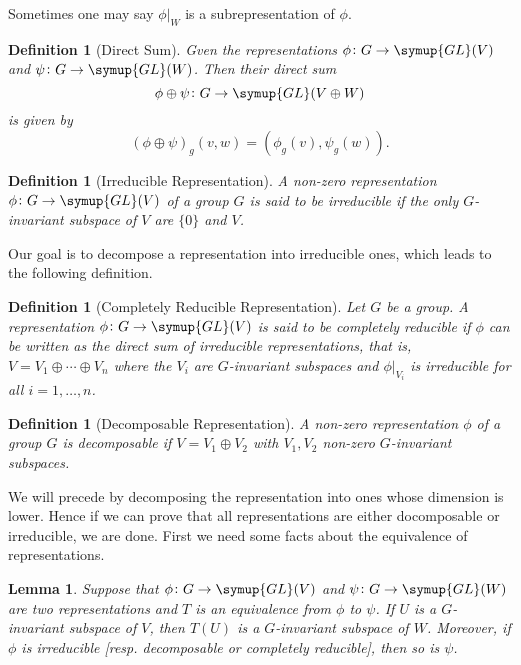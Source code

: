 \documentclass{assignment}[2019/10/15]
\theoremstyle{plain}
\newtheorem{definition}[theorem]{Definition}
\newtheorem{lemma}[theorem]{Lemma}
\newcommand{\GL}{\mathop{}\!\symup{GL}}
\numberwithin{equation}{section}
\begin{document}
    Sometimes one may say $\phi|_W$ is a subrepresentation of $\phi$.

    \begin{definition}[Direct Sum]
        Gven the representations $\phi\colon G\to \GL(V)$ and $\psi\colon G\to\GL(W)$. Then their \emph{direct sum}
        \begin{equation}
            \phi\oplus\psi\colon G\to\GL(V\oplus W)
        \end{equation}
        is given by
        \begin{equation}
            (\phi\oplus\psi)_g(v, w) = (\phi_g(v), \psi_g(w)).
        \end{equation}
    \end{definition}

    \begin{definition}[Irreducible Representation]
        A non-zero representation $\phi\colon G\to \GL(V)$ of a group $G$ is said to be \emph{irreducible} if the only $G$-invariant subspace of $V$ are $\{0\}$ and $V$.
    \end{definition}

    Our goal is to decompose a representation into irreducible ones, which leads to the following definition.

    \begin{definition}[Completely Reducible Representation]
        Let $G$ be a group. A representation $\phi\colon G\to \GL(V)$ is said to be \emph{completely reducible} if $\phi$ can be written as the direct sum of irreducible representations, that is, $V=V_1\oplus \dotsb \oplus V_n$ where the $V_i$ are $G$-invariant subspaces and $\phi|_{V_i}$ is irreducible for all $i=1, \dotsc, n$.
    \end{definition}

    \begin{definition}[Decomposable Representation]
        A non-zero representation $\phi$ of a group $G$ is \emph{decomposable} if $V = V_1\oplus V_2$ with $V_1, V_2$ non-zero $G$-invariant subspaces.
    \end{definition}

    We will precede by decomposing the representation into ones whose dimension is lower. Hence if we can prove that all representations are either docomposable or irreducible, we are done. First we need some facts about the equivalence of representations.

    \begin{lemma}
        Suppose that $\phi\colon G\to \GL(V)$ and $\psi\colon G\to\GL(W)$ are two representations and $T$ is an equivalence from $\phi$ to $\psi$. If $U$ is a $G$-invariant subspace of $V$, then $T(U)$ is a $G$-invariant subspace of $W$. Moreover, if $\phi$ is irreducible [resp. decomposable or completely reducible], then so is $\psi$.
    \end{lemma}
\end{document}
